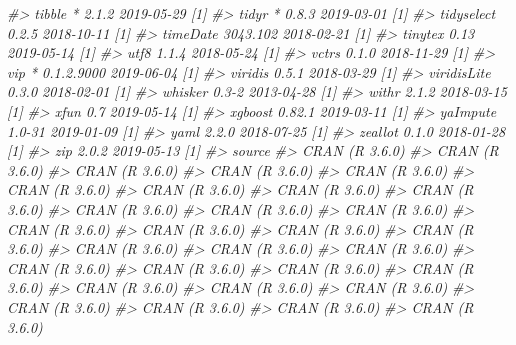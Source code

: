 \documentclass[]{krantz}
\makeatletter
\newenvironment{Shaded}{\begin{snugshade}}{\end{snugshade}}
\newcommand{\CommentTok}[1]{\textcolor[rgb]{0.37,0.37,0.37}{\textit{#1}}}
\newenvironment{kframe}{%
\medskip{}
\setlength{\fboxsep}{.8em}
 \def\at@end@of@kframe{}%
 \ifinner\ifhmode%
  \def\at@end@of@kframe{\end{minipage}}%
  \begin{minipage}{\columnwidth}%
 \fi\fi%
 \def\FrameCommand##1{\hskip\@totalleftmargin \hskip-\fboxsep
 \colorbox{shadecolor}{##1}\hskip-\fboxsep
     \hskip-\linewidth \hskip-\@totalleftmargin \hskip\columnwidth}%
 \MakeFramed {\advance\hsize-\width
   \@totalleftmargin\z@ \linewidth\hsize
   \@setminipage}}%
 {\par\unskip\endMakeFramed%
 \at@end@of@kframe}
\renewenvironment{Shaded}{\begin{kframe}}{\end{kframe}}
\makeatother
\begin{document}
\begin{Shaded}
\begin{Highlighting}[]
\CommentTok{#>    tibble        * 2.1.2      2019-05-29 [1]}
\CommentTok{#>    tidyr         * 0.8.3      2019-03-01 [1]}
\CommentTok{#>    tidyselect      0.2.5      2018-10-11 [1]}
\CommentTok{#>    timeDate        3043.102   2018-02-21 [1]}
\CommentTok{#>    tinytex         0.13       2019-05-14 [1]}
\CommentTok{#>    utf8            1.1.4      2018-05-24 [1]}
\CommentTok{#>    vctrs           0.1.0      2018-11-29 [1]}
\CommentTok{#>    vip           * 0.1.2.9000 2019-06-04 [1]}
\CommentTok{#>    viridis         0.5.1      2018-03-29 [1]}
\CommentTok{#>    viridisLite     0.3.0      2018-02-01 [1]}
\CommentTok{#>    whisker         0.3-2      2013-04-28 [1]}
\CommentTok{#>    withr           2.1.2      2018-03-15 [1]}
\CommentTok{#>    xfun            0.7        2019-05-14 [1]}
\CommentTok{#>    xgboost         0.82.1     2019-03-11 [1]}
\CommentTok{#>    yaImpute        1.0-31     2019-01-09 [1]}
\CommentTok{#>    yaml            2.2.0      2018-07-25 [1]}
\CommentTok{#>    zeallot         0.1.0      2018-01-28 [1]}
\CommentTok{#>    zip             2.0.2      2019-05-13 [1]}
\CommentTok{#>  source                         }
\CommentTok{#>  CRAN (R 3.6.0)                 }
\CommentTok{#>  CRAN (R 3.6.0)                 }
\CommentTok{#>  CRAN (R 3.6.0)                 }
\CommentTok{#>  CRAN (R 3.6.0)                 }
\CommentTok{#>  CRAN (R 3.6.0)                 }
\CommentTok{#>  CRAN (R 3.6.0)                 }
\CommentTok{#>  CRAN (R 3.6.0)                 }
\CommentTok{#>  CRAN (R 3.6.0)                 }
\CommentTok{#>  CRAN (R 3.6.0)                 }
\CommentTok{#>  CRAN (R 3.6.0)                 }
\CommentTok{#>  CRAN (R 3.6.0)                 }
\CommentTok{#>  CRAN (R 3.6.0)                 }
\CommentTok{#>  CRAN (R 3.6.0)                 }
\CommentTok{#>  CRAN (R 3.6.0)                 }
\CommentTok{#>  CRAN (R 3.6.0)                 }
\CommentTok{#>  CRAN (R 3.6.0)                 }
\CommentTok{#>  CRAN (R 3.6.0)                 }
\CommentTok{#>  CRAN (R 3.6.0)                 }
\CommentTok{#>  CRAN (R 3.6.0)                 }
\CommentTok{#>  CRAN (R 3.6.0)                 }
\CommentTok{#>  CRAN (R 3.6.0)                 }
\CommentTok{#>  CRAN (R 3.6.0)                 }
\CommentTok{#>  CRAN (R 3.6.0)                 }
\CommentTok{#>  CRAN (R 3.6.0)                 }
\CommentTok{#>  CRAN (R 3.6.0)                 }
\CommentTok{#>  CRAN (R 3.6.0)                 }
\CommentTok{#>  CRAN (R 3.6.0)                 }
\CommentTok{#>  CRAN (R 3.6.0)                 }
\CommentTok{#>  CRAN (R 3.6.0)                 }
\CommentTok{#>  CRAN (R 3.6.0)                 }

\end{Highlighting}
\end{Shaded}
\end{document}

